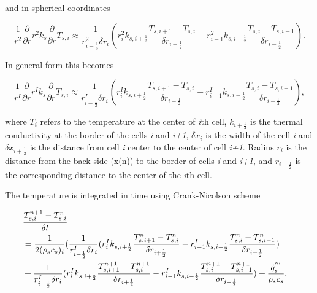 and in spherical coordinates

\begin{equation}
\label{T_spher}
    \frac{1}{r^2}\frac{\partial}{\partial r} r^2 k_s \frac{\partial}{\partial r} T_{s,i} 
    \approx \frac{1}{r^2_{i-\frac{1}{2}} \delta r_i}(r_{i}^2 k_{s,i+\frac{1}{2}}\frac{T_{s,i+1}-T_{s,i}}{\delta r_{i+\frac{1}{2}}}-r^2_{i-1}k_{s,i-\frac{1}{2}}\frac{T_{s,i}-T_{s,i-1}}{\delta r_{i-\frac{1}{2}}}).
\end{equation}

In general form this becomes

\begin{equation}
\label{T_general}
    \frac{1}{r^{I}}\frac{\partial}{\partial r} r^{I}k_s \frac{\partial}{\partial r} T_{s,i} 
    \approx \frac{1}{r_{i-\frac{1}{2}}^I \delta r_i}(r_{i}^{I}k_{s,i+\frac{1}{2}}\frac{T_{s,i+1}-T_{s,i}}{\delta r_{i+\frac{1}{2}}}-r_{i-1}^{I}k_{s,i-\frac{1}{2}}\frac{T_{s,i}-T_{s,i-1}}{\delta r_{i-\frac{1}{2}}}),
\end{equation}

where $T_i$ refers to the temperature at the center of \textit{i}th cell, $k_{i+\frac{1}{2}}$ is the thermal conductivity at the border of the cells \textit{i} and \textit{i+1}, $\delta x_i$ is the width of the cell \textit{i} and  $\delta x_{i+\frac{1}{2}}$ is the distance from cell \textit{i} center to the center of cell \textit{i+1}. Radius $r_i$ is the distance from the back side (x(n)) to the border of cells \textit{i} and \textit{i+1}, and $r_{i-\frac{1}{2}}$ is the corresponding distance to the center of the \textit{i}th cell.

The temperature is integrated in time using Crank-Nicolson scheme

\begin{eqnarray}
\label{crank-nicolson}
  \lefteqn{\frac{T_{s,i}^{n+1}-T_{s,i}^{n}}{\delta t}}\nonumber\\
 & = \frac{1}{2(\rho_s c_s)_i}(\frac{1}{r_{i-\frac{1}{2}}^I \delta r_i}(r_{i}^{I}k_{s,i+\frac{1}{2}}\frac{T_{s,i+1}^{n}-T_{s,i}^{n}}{\delta r_{i+\frac{1}{2}}}-r_{i-1}^{I}k_{s,i-\frac{1}{2}}\frac{T_{s,i}^{n}-T_{s,i-1}^{n}}{\delta r_{i-\frac{1}{2}}})\nonumber\\
&  +\frac{1}{r_{i-\frac{1}{2}}^I \delta r_i}(r_{i}^{I}k_{s,i+\frac{1}{2}}\frac{T_{s,i+1}^{n+1}-T_{s,i}^{n+1}}{\delta r_{i+\frac{1}{2}}}-r_{i-1}^{I}k_{s,i-\frac{1}{2}}\frac{T_{s,i}^{n+1}-T_{s,i-1}^{n+1}}{\delta r_{i-\frac{1}{2}}}) +\frac{\dot{q}^{'''}_s}{\rho_s c_s}.\\\nonumber
\end{eqnarray}

